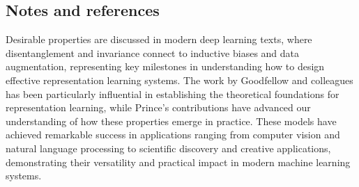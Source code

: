 

\subsection{Notes and references}

Desirable properties are discussed in modern deep learning texts, where disentanglement and invariance connect to inductive biases and data augmentation, representing key milestones in understanding how to design effective representation learning systems. The work by Goodfellow and colleagues has been particularly influential in establishing the theoretical foundations for representation learning, while Prince's contributions have advanced our understanding of how these properties emerge in practice. These models have achieved remarkable success in applications ranging from computer vision and natural language processing to scientific discovery and creative applications, demonstrating their versatility and practical impact in modern machine learning systems.
